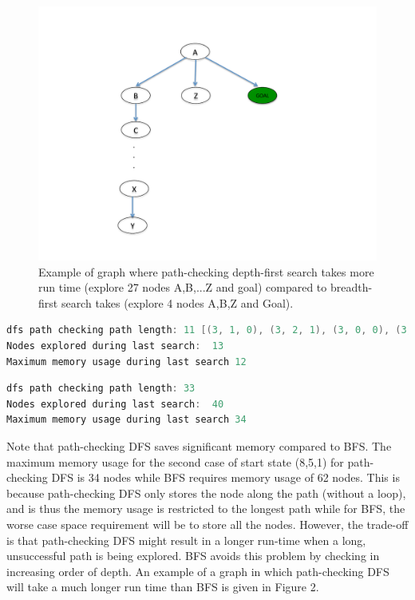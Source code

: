 \documentclass[9.5pt]{extarticle}
\begin{document}
\begin{figure}[H]
\centering
\includegraphics[scale=0.3]{dfs.pdf}
\caption{Example of graph where path-checking depth-first search takes more run time (explore 27 nodes A,B,...Z and goal) compared to breadth-first search takes (explore 4 nodes A,B,Z and Goal). }
\label{Figure 2}
\end{figure}

\begin{lstlisting}[language=java,caption={Output for path-checking DFS for start state of (3, 3, 1)}]
dfs path checking path length: 11 [(3, 1, 0), (3, 2, 1), (3, 0, 0), (3, 1, 1), (1, 1, 0), (2, 2, 1), (0, 2, 0), (0, 3, 1), (0, 1, 0), (0, 2, 1), (0, 0, 0)]
Nodes explored during last search:  13
Maximum memory usage during last search 12
\end{lstlisting}

\begin{lstlisting}[language=java,caption={Output for path-checking DFS for start state of (8, 5, 1)}]
dfs path checking path length: 33 
Nodes explored during last search:  40
Maximum memory usage during last search 34
\end{lstlisting}

Note that path-checking DFS saves significant memory compared to BFS. The maximum memory usage for the second case of start state (8,5,1) for path-checking DFS is 34 nodes while BFS requires memory usage of 62 nodes. This is because path-checking DFS only stores the node along the path (without a loop), and is thus the memory usage is restricted to the longest path while for BFS, the worse case space requirement will be to store all the nodes. However, the trade-off is that path-checking DFS might result in a longer run-time when a long, unsuccessful path is being explored. BFS avoids this problem by checking in increasing order of depth. An example of a graph in which path-checking DFS will take a much longer run time than BFS is given in Figure 2.\\
\end{document}
